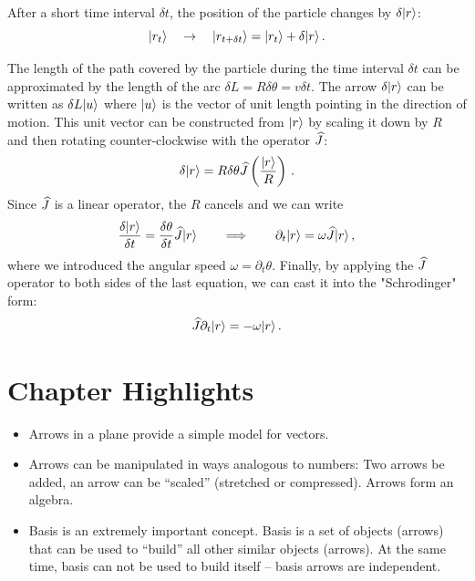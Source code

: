 After a short time interval $\delta t$, the position of the particle changes by $\delta|{r}\rangle$:
\[
|{r_t}\rangle\quad\rightarrow\quad |{r_{t+\delta t}}\rangle = |{r_t}\rangle+\delta|{r}\rangle\,.
\]

The length of the path covered by the particle during the time interval $\delta t$ can be approximated by the length of the arc  $\delta L=R\delta\theta=v\delta t$. The arrow $\delta|{r}\rangle$ can be written as $\delta L|{u}\rangle$ where $|{u}\rangle$ is the vector of unit length pointing in the direction of motion. This unit vector can be constructed from $|{r}\rangle$ by scaling it down by $R$ and then rotating counter-clockwise with the operator $\widehat{J}$: 
\[
\delta|{r}\rangle=R\delta\theta\widehat{J}\left(\frac{|{r}\rangle}{R}\right)\,.
\]
Since $\widehat{J}$ is a linear operator, the $R$ cancels and we can write
\[
\frac{\delta|{r}\rangle}{\delta t}=\frac{\delta\theta}{\delta t}\widehat{J}|{r}\rangle\qquad\Longrightarrow\qquad
\partial_t|{r}\rangle=\omega\widehat{J}|{r}\rangle\,,
\]
where we introduced the angular speed $\omega=\partial_t\theta$. Finally, by applying the $\widehat{J}$ operator to both sides of the last equation, we can cast it into the "Schrodinger" form:
\[
\widehat{J}\partial_t|{r}\rangle=-\omega|{r}\rangle\,.
\]  



\section*{Chapter Highlights}
{\chhc
  \it
\begin{itemize}
\item Arrows in a plane provide a simple model for vectors.
\item Arrows can be manipulated in ways analogous to numbers: Two arrows
  be added, an arrow can be ``scaled'' (stretched or compressed). Arrows form
  an algebra.
\item Basis is an extremely important concept. Basis is a set of
  objects (arrows) that can be used to ``build'' all other similar
  objects (arrows). At the same time, basis can not be used to build
  itself -- basis arrows are independent.
\end{itemize}
}
